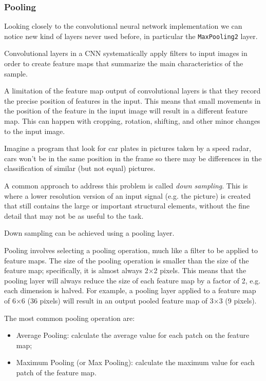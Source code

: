 \begin{attention}
\subsubsection{Pooling}

Looking closely to the convolutional neural network implementation we can notice new kind of 
layers never used before, in particular the \texttt{MaxPooling2} layer.

Convolutional layers in a CNN systematically
apply filters to input images in order to create feature maps
that summarize the main characteristics of the sample.

A limitation of the feature map output of convolutional layers is that
they record the precise position of features in the input. This means
that small movements in the position of the feature in the input image
will result in a different feature map. This can happen with
cropping, rotation, shifting, and other minor changes to the input
image.

Imagine a program that look for car plates in pictures taken by a speed
radar, cars won't be in the same position in the frame so there may be
differences in the classification of similar (but not equal) pictures.

A common approach to address this problem is called \emph{down sampling}. 
This is where a lower resolution version of
an input signal (e.g. the picture) is created that still contains the
large or important structural elements, without the fine detail that may
not be as useful to the task.

Down sampling can be achieved using a pooling layer.

Pooling involves selecting a pooling operation, much like a filter to be
applied to feature maps. The size of the pooling operation is
smaller than the size of the feature map; specifically, it is almost
always 2×2 pixels. This means that the pooling layer will always reduce
the size of each feature map by a factor of 2, e.g. each dimension is
halved. For example, a pooling layer applied to a feature map of 6×6 (36
pixels) will result in an output pooled feature map of 3×3 (9 pixels).

The most common pooling operation are:
\begin{itemize}
	\tightlist
	\item Average Pooling: calculate the
	average value for each patch on the feature map;
	\item Maximum Pooling (or Max Pooling): calculate the maximum value for each patch of the feature
	map.
\end{itemize}
\end{attention}


